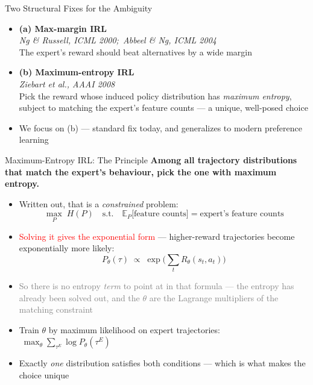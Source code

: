 \begin{frame}{Two Structural Fixes for the Ambiguity}
\begin{itemize}
    \setlength{\itemsep}{0.75em}
    \item \textbf{(a) Max-margin IRL} \\
          \emph{Ng \& Russell, ICML 2000;\ Abbeel \& Ng, ICML 2004} \\
          The expert's reward should beat alternatives by a wide margin
    \item \textbf{(b) Maximum-entropy IRL} \\
          \emph{Ziebart et al., AAAI 2008} \\
          Pick the reward whose induced policy distribution has \emph{maximum entropy}, subject to matching the expert's feature counts --- a unique, well-posed choice
    \item We focus on (b) --- standard fix today, and generalizes to modern preference learning
\end{itemize}
\end{frame}

\begin{frame}{Maximum-Entropy IRL: The Principle}
\textbf{Among all trajectory distributions that match the expert's behaviour, pick the one with maximum entropy.}
\vspace{0.3em}
\begin{itemize}
    \setlength{\itemsep}{0.4em}
    \item Written out, that is a \emph{constrained} problem:
    \[
        \max_{P} \; H(P)
        \quad \text{s.t.} \quad
        \mathbb{E}_{P}\big[\text{feature counts}\big] = \text{expert's feature counts}
    \]
    \item \textcolor{red}{Solving it gives the exponential form} --- higher-reward trajectories become exponentially more likely:
    \[
        P_\theta(\tau) \;\propto\; \exp\!\Big(\textstyle\sum_t R_\theta(s_t, a_t)\Big)
    \]
    \item \textcolor{gray}{So there is no entropy \emph{term} to point at in that formula --- the entropy has already been solved out, and the $\theta$ are the Lagrange multipliers of the matching constraint}
    \item Train $\theta$ by maximum likelihood on expert trajectories: $\;\max_\theta \sum_{\tau^E} \log P_\theta(\tau^E)$
    \item Exactly \emph{one} distribution satisfies both conditions --- which is what makes the choice unique
\end{itemize}
\end{frame}

